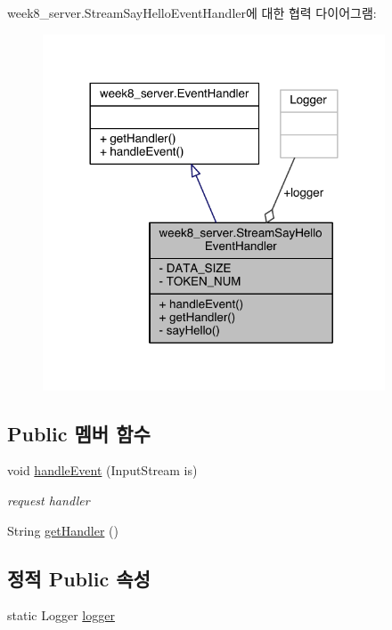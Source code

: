 week8\-\_\-server.\-Stream\-Say\-Hello\-Event\-Handler에 대한 협력 다이어그램\-:
\nopagebreak
\begin{figure}[H]
\begin{center}
\leavevmode
\includegraphics[width=288pt]{classweek8__server_1_1_stream_say_hello_event_handler__coll__graph}
\end{center}
\end{figure}
\subsection*{Public 멤버 함수}
\begin{DoxyCompactItemize}
\item 
void \hyperlink{classweek8__server_1_1_stream_say_hello_event_handler_a2c2be02c3987ca818d6c09fd800d0f34}{handle\-Event} (Input\-Stream is)
\begin{DoxyCompactList}\small\item\em request handler \end{DoxyCompactList}\item 
String \hyperlink{classweek8__server_1_1_stream_say_hello_event_handler_a179e9b7dae2e32891de7dbc707e3d07e}{get\-Handler} ()
\end{DoxyCompactItemize}
\subsection*{정적 Public 속성}
\begin{DoxyCompactItemize}
\item 
static Logger \hyperlink{classweek8__server_1_1_stream_say_hello_event_handler_a68c45171ab9184973fa32d5b18f1fc70}{logger}
\end{DoxyCompactItemize}
